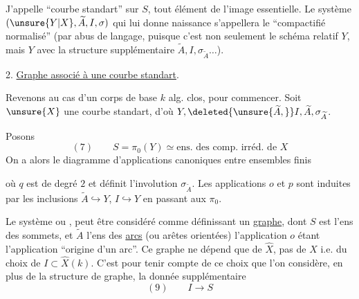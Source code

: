 J'appelle ``courbe  standart'' sur $S$, tout élément de l'image essentielle. Le système $(\unsure{Y|X},\widetilde A,I,\sigma)$ qui lui donne naissance s'appellera le ``compactifié normalisé''  (par abus de  langage, puisque c'est non seulement le schéma relatif $Y$, mais $Y$ avec la structure supplémentaire $\widetilde A,I,\sigma_{\widetilde A}\ldots$).

2. \uline{Graphe associé à une courbe standart}.

Revenons au cas d'un corps de base $k$ alg. clos, pour commencer. Soit $\unsure{X}$ une courbe standart, d'où $Y,\deleted{\unsure{\widetilde A,}}I,\widetilde A,\sigma_{\widetilde A}$.

Posons
\[
(7)\qquad S=\pi_0(Y)\simeq\text{ens. des comp. irréd. de }X
\]
On a alors le diagramme d'applications canoniques entre ensembles finis

où $q$ est de degré $2$ et définit l'involution $\sigma_{\widetilde A}$. Les applications $o$ et $p$ sont induites par les inclusions $\widetilde A\hookrightarrow Y$, $I\hookrightarrow Y$ en passant aux $\pi_0$.

Le système
ou
, peut être considéré comme définissant un \uline{graphe}, dont $S$ est l'ens des sommets, et $\widetilde A$ l'ens des \uline{arcs} (ou arêtes orientées) l'application $o$ étant l'application ``origine d'un arc''. Ce graphe ne dépend que de $\widehat X$, pas de $X$ i.e. du choix de $I\subset\widehat X(k)$. C'est pour tenir compte de ce choix que l'on considère, en plus de la structure de graphe, la donnée supplémentaire
\[
(9)\qquad I\longrightarrow S
\]


